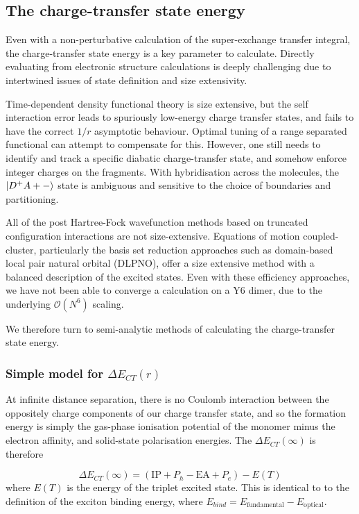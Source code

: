 \documentclass[aps,physrev,reprint,superscriptaddress,nofootinbib,amsmath,amssymb,a4paper]{revtex4-2}
\DeclarePairedDelimiter\ket{\lvert}{\rangle}
\begin{document}
\subsection{The charge-transfer state energy}

Even with a non-perturbative calculation of the super-exchange transfer integral, the charge-transfer state energy is a key parameter to calculate. 
Directly evaluating from electronic structure calculations is deeply challenging due to intertwined issues of state definition and size extensivity. 

Time-dependent density functional theory is size extensive, but the self interaction error leads to spuriously low-energy charge transfer states, and fails to have the correct $1/r$ asymptotic behaviour. 
Optimal tuning of a range separated functional can attempt to compensate for this. 
However, one still needs to identify and track a specific diabatic charge-transfer state, and somehow enforce integer charges on the fragments. 
With hybridisation across the molecules, the $\ket{D^+ A+-}$ state is ambiguous and sensitive to the choice of boundaries and partitioning. 

All of the post Hartree-Fock wavefunction methods based on truncated configuration interactions are not size-extensive. 
Equations of motion coupled-cluster, particularly the basis set reduction approaches such as domain-based local pair natural orbital (DLPNO), offer a size extensive method with a balanced description of the excited states. 
Even with these efficiency approaches, we have not been able to converge a calculation on a Y6 dimer, due to the underlying $\mathcal{O}(N^6)$ scaling.

We therefore turn to semi-analytic methods of calculating the charge-transfer state energy. 

\subsubsection{Simple model for $\Delta E_{CT}(r)$}

At infinite distance separation, there is no Coulomb interaction between the oppositely charge components of our charge transfer state, and so the formation energy is simply the gas-phase ionisation potential of the monomer minus the electron affinity, and solid-state polarisation energies. 
The $\Delta E_{CT}(\infty)$ is therefore 

\begin{equation}
    \Delta E_{CT}(\infty) = (\textrm{IP} + P_h- \textrm{EA} + P_e) - E(T)
\end{equation}
% 
where $E(T)$ is the energy of the triplet excited state. 
This is identical to to the definition of the exciton binding energy, where $E_{bind} = E_{\textrm{fundamental}} - E_{\textrm{optical}}$. 
\end{document}
